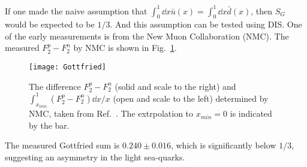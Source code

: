 If one made the naive assumption that $\int_0^1\dd{x} \bar{u}\left(x\right)=\int_0^1\dd{x} \bar{d}\left(x\right)$,
then $S_G$ would be expected to be $1/3$. And this assumption can be tested using DIS.
One of the early measurements is from the New Muon Collaboration (NMC)\cite{amaudruz1991}. 
The measured $F_2^p-F_2^n$ by NMC is shown in Fig.\ \ref{fig:NMC_Gottfried}. 
\begin{figure}[htbp!]
	\centering
	\texttt{[image: Gottfried]}
	\caption{The difference $F_2^p -F_2^n$ (solid and scale to the right) and 
		$\int_{x_{min}}^1 (F_2^p-F_2^n)\dd{x}/x$ (open and scale to the left) 
		determined by NMC, taken from Ref.\ \cite{amaudruz1991}. The extrpolation
		to $x_{min}=0$ is indicated by the bar.}
	\label{fig:NMC_Gottfried}
\end{figure}
The measured Gottfried sum is $0.240 \pm 0.016$, which is significantly below 
$1/3$, suggesting an asymmetry in the light sea-quarks.


